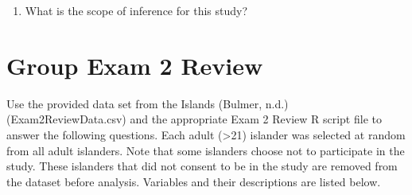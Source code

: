 \documentclass[
]{report}
\providecommand{\tightlist}{%
  \setlength{\itemsep}{0pt}\setlength{\parskip}{0pt}}
\begin{document}
\vspace{1in}

\begin{enumerate}
\def\labelenumi{\arabic{enumi}.}
\setcounter{enumi}{19}
\tightlist
\item
  What is the scope of inference for this study?
\end{enumerate}

\newpage

\section{Group Exam 2 Review}\label{group-exam-2-review}

Use the provided data set from the Islands (Bulmer, n.d.) (Exam2ReviewData.csv) and the appropriate Exam 2 Review R script file to answer the following questions. Each adult (\textgreater21) islander was selected at random from all adult islanders. Note that some islanders choose not to participate in the study. These islanders that did not consent to be in the study are removed from the dataset before analysis. Variables and their descriptions are listed below.
\end{document}
